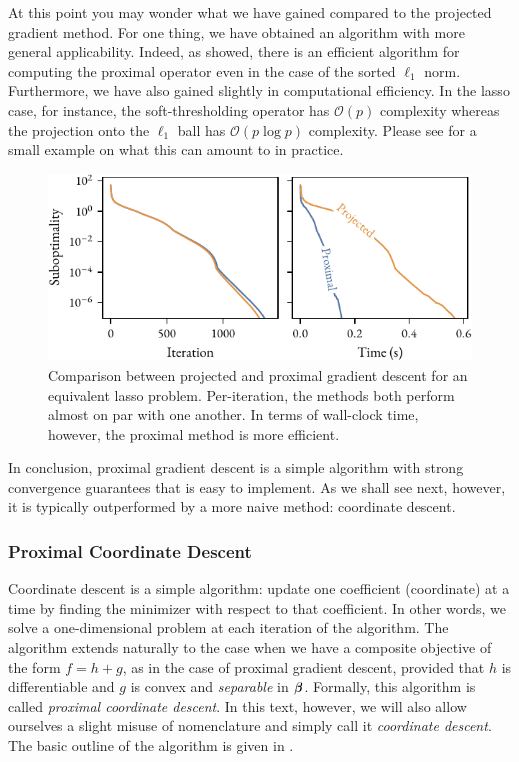 At this point you may wonder what we have gained compared to the projected gradient method. For one thing, we have obtained an algorithm with more general applicability. Indeed, as \textcite{bogdan2015} showed, there is an efficient algorithm for computing the proximal operator even in the case of the sorted \(\ell_1\) norm. Furthermore, we have also gained slightly in computational efficiency. In the lasso case, for instance, the soft-thresholding operator has \(\mathcal{O}(p)\) complexity whereas the projection onto the \(\ell_1\) ball has \(\mathcal{O}(p\log p)\) complexity. Please see  for a small example on what this can amount to in practice.

\begin{figure}[htpb]
  \centering
  \includegraphics[]{figures/lasso-projgrad-comp.pdf}
  \caption{%
    Comparison between projected and proximal gradient descent for an equivalent lasso problem.
    Per-iteration, the methods both perform almost on par with one another. In terms of wall-clock time, however, the proximal method is more efficient.
  }
  \label{fig:lasso-projgrad-comp}
\end{figure}

In conclusion, proximal gradient descent is a simple algorithm with strong convergence guarantees that is easy to implement. As we shall see next, however, it is typically outperformed by a more naive method: coordinate descent.

\subsubsection{Proximal Coordinate Descent}

Coordinate descent is a simple algorithm: update one coefficient (coordinate) at a time by finding the minimizer with respect to that coefficient. In other words, we solve a one-dimensional problem at each iteration of the algorithm. The algorithm extends naturally to the case when we have a composite objective of the form \(f = h + g\), as in the case of proximal gradient descent, provided that \(h\) is differentiable and \(g\) is convex and \emph{separable} in \(\boldsymbol{\beta}\). Formally, this algorithm is called \emph{proximal coordinate descent}. In this text, however, we will also allow ourselves a slight misuse of nomenclature and simply call it \emph{coordinate descent}. The basic outline of the algorithm is given in .

